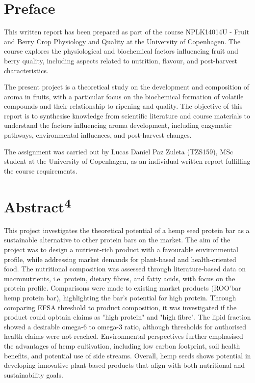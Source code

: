 \setlength{\headheight}{12.71342pt}
\addtolength{\topmargin}{-0.71342pt}


\section*{Preface}
This written report has been prepared as part of the course NPLK14014U - Fruit and Berry Crop Physiology and Quality at the University of Copenhagen. The course explores the physiological and biochemical factors influencing fruit and berry quality, including aspects related to nutrition, flavour, and post-harvest characteristics.

\vspace{1em}
The present project is a theoretical study on the development and composition of aroma in fruits, with a particular focus on the biochemical formation of volatile compounds and their relationship to ripening and quality. The objective of this report is to synthesise knowledge from scientific literature and course materials to understand the factors influencing aroma development, including enzymatic pathways, environmental influences, and post-harvest changes.

\vspace{1em}
The assignment was carried out by Lucas Daniel Paz Zuleta (TZS159), MSc student at the University of Copenhagen, as an individual written report fulfilling the course requirements.

\section*{Abstract\textsuperscript{4}}
This project investigates the theoretical potential of a hemp seed protein bar as a sustainable alternative to other protein bars on the market. The aim of the project was to design a nutrient-rich product with a favourable environmental profile, while addressing market demands for plant-based and health-oriented food. The nutritional composition was assessed through literature-based data on macronutrients, i.e. protein, dietary fibres, and fatty acids, with focus on the protein profile. Comparisons were made to existing market products (ROO'bar hemp protein bar), highlighting the bar's potential for high protein. Through comparing EFSA threshold to product composition, it was investigated if the product could opbtain claims as "high protein" and "high fibre". The lipid fraction showed a desirable omega-6 to omega-3 ratio, although thresholds for authorised health claims were not reached. Environmental perspectives further emphasised the advantages of hemp cultivation, including low carbon footprint, soil health benefits, and potential use of side streams. Overall, hemp seeds shows potential in developing innovative plant-based products that align with both nutritional and sustainability goals.


